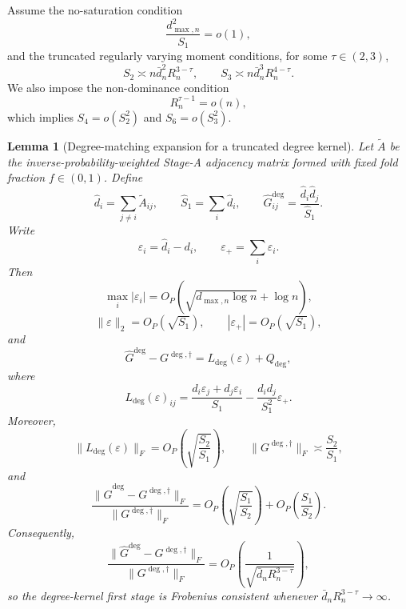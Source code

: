 \documentclass[12pt]{article}
\newtheorem{lemma}{Lemma}
\newcommand{\1}{\mathbf{1}}
\begin{document}
Assume the no-saturation condition
\[
    \frac{d_{\max,n}^2}{S_1}=o(1),
\]
and the truncated regularly varying moment conditions, for some
\(\tau\in(2,3)\),
\[
    S_2\asymp n\bar d_n^2R_n^{3-\tau},
    \qquad
    S_3\asymp n\bar d_n^3R_n^{4-\tau}.
\]
We also impose the non-dominance condition
\[
    R_n^{\tau-1}=o(n),
\]
which implies \(S_4=o(S_2^2)\) and \(S_6=o(S_3^2)\).

\begin{lemma}[Degree-matching expansion for a truncated degree kernel]
\label{lem:truncated-degree-first-stage}
Let \(\widetilde A\) be the inverse-probability-weighted Stage-A adjacency
matrix formed with fixed fold fraction \(f\in(0,1)\). Define
\[
    \widehat d_i=\sum_{j\ne i}\widetilde A_{ij},
    \qquad
    \widehat S_1=\sum_i\widehat d_i,
    \qquad
    \widehat G^{\deg}_{ij}
    =
    \frac{\widehat d_i\widehat d_j}{\widehat S_1}.
\]
Write
\[
    \varepsilon_i=\widehat d_i-d_i,
    \qquad
    \varepsilon_+=\sum_i\varepsilon_i.
\]
Then
\[
    \max_i|\varepsilon_i|
    =
    O_P\!\left(\sqrt{d_{\max,n}\log n}+\log n\right),
\]
\[
    \|\varepsilon\|_2=O_P(\sqrt{S_1}),
    \qquad
    |\varepsilon_+|=O_P(\sqrt{S_1}),
\]
and
\[
    \widehat G^{\deg}-G^{\deg,\dagger}
    =
    L_{\deg}(\varepsilon)+Q_{\deg},
\]
where
\[
    L_{\deg}(\varepsilon)_{ij}
    =
    \frac{d_i\varepsilon_j+d_j\varepsilon_i}{S_1}
    -
    \frac{d_i d_j}{S_1^2}\varepsilon_+ .
\]
Moreover,
\[
    \|L_{\deg}(\varepsilon)\|_F
    =
    O_P\!\left(\sqrt{\frac{S_2}{S_1}}\right),
    \qquad
    \|G^{\deg,\dagger}\|_F
    \asymp
    \frac{S_2}{S_1},
\]
and
\[
    \frac{\|\widehat G^{\deg}-G^{\deg,\dagger}\|_F}
         {\|G^{\deg,\dagger}\|_F}
    =
    O_P\!\left(\sqrt{\frac{S_1}{S_2}}\right)
    +
    O_P\!\left(\frac{S_1}{S_2}\right).
\]
Consequently,
\[
    \frac{\|\widehat G^{\deg}-G^{\deg,\dagger}\|_F}
         {\|G^{\deg,\dagger}\|_F}
    =
    O_P\!\left(
        \frac{1}{\sqrt{\bar d_n R_n^{3-\tau}}}
    \right),
\]
so the degree-kernel first stage is Frobenius consistent whenever
\(\bar d_nR_n^{3-\tau}\to\infty\).
\end{lemma}
\end{document}
